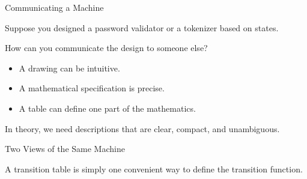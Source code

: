 \documentclass[10pt,aspectratio=169]{beamer}
\begin{document}
\begin{frame}{Communicating a Machine}

Suppose you designed a password validator or a tokenizer based on states.

\vspace{1em}

How can you communicate the design to someone else?


\begin{itemize}
\item A drawing can be intuitive.
\item A mathematical specification is precise.
\item A table can define one part of the mathematics.
\end{itemize}

\vspace{1em}

In theory, we need descriptions that are clear, compact, and unambiguous.

\end{frame}

\begin{frame}{Two Views of the Same Machine}

\begin{center}
\end{center}

\vspace{1em}

A transition table is simply one convenient way to define the transition function.

\end{frame}
\end{document}
